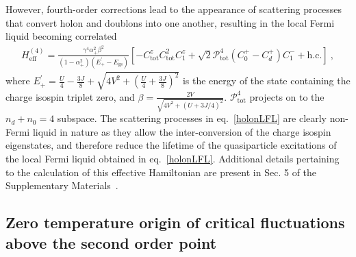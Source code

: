 \documentclass{iopart}
\begin{document}
However, fourth-order corrections lead to the appearance of scattering processes that convert holon and doublons into one another, resulting in the local Fermi liquid becoming correlated
\begin{eqnarray}
	H_\text{eff}^{(4)} = \frac{\gamma^4 \alpha_+^2 \beta^2}{\left( 1 - \alpha_+^2 \right) \left( E_+^\prime - E_\text{gs} \right) } \left[- C_\text{tot}^z C_\text{tot}^2 C_1^z + \sqrt{2}\mathcal{P}_\text{tot}^{4}\left(C_0^+ - C_d^+\right)C_1^- + \text{h.c.}\right]~,\label{holonLFL}
\end{eqnarray}
where \(E_+^\prime = \frac{U}{4} - \frac{3J}{8} + \sqrt{4V^2 + \left(\frac{U}{4} + \frac{3J}{8}\right)^2}\) is the energy of the state containing the charge isospin triplet zero, and \(\beta = \frac{2V}{\sqrt{4V^2 + \left(U + 3J/4\right)^2}}\). \(\mathcal{P}^4_\text{tot}\) projects on to the \(n_d + n_0 = 4\) subspace.
The scattering processes in eq.~\eqref{holonLFL} are clearly non-Fermi liquid in nature as they allow the inter-conversion of the charge isospin eigenstates, and therefore reduce the lifetime of the quasiparticle excitations of the local Fermi liquid obtained in eq.~\eqref{holonLFL}. Additional details pertaining to the calculation of this effective Hamiltonian are present in Sec. 5 of the Supplementary Materials~\cite{supp_mat}.

\subsection{Zero temperature origin of critical fluctuations above the second order point}
\label{rc2-corrs}
\end{document}
